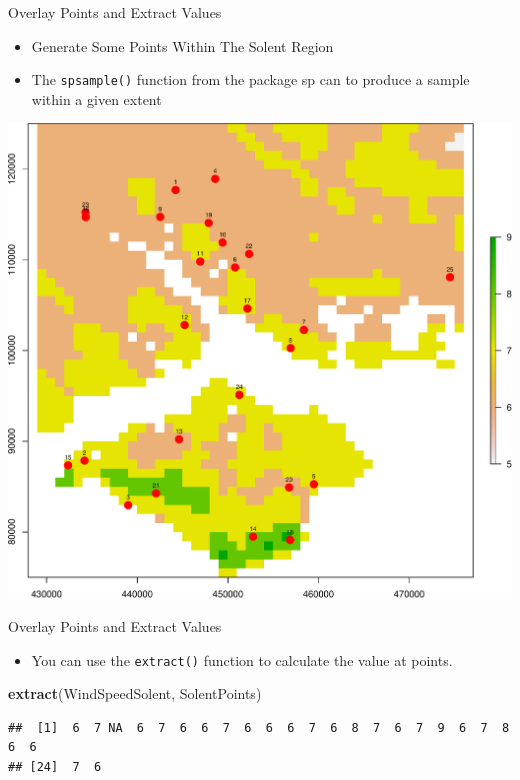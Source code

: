 \documentclass[10pt,ignorenonframetext,]{beamer}
\newenvironment{Shaded}{\begin{snugshade}}{\end{snugshade}}
\newcommand{\KeywordTok}[1]{\textcolor[rgb]{0.13,0.29,0.53}{\textbf{{#1}}}}
\newcommand{\DataTypeTok}[1]{\textcolor[rgb]{0.13,0.29,0.53}{{#1}}}
\newcommand{\DecValTok}[1]{\textcolor[rgb]{0.00,0.00,0.81}{{#1}}}
\newcommand{\StringTok}[1]{\textcolor[rgb]{0.31,0.60,0.02}{{#1}}}
\newcommand{\NormalTok}[1]{{#1}}
\providecommand{\tightlist}{%
  \setlength{\itemsep}{0pt}\setlength{\parskip}{0pt}}
\begin{document}
\begin{frame}[fragile]{Overlay Points and Extract Values}

\begin{itemize}
\tightlist
\item
  Generate Some Points Within The Solent Region
\item
  The \texttt{spsample()} function from the package \alert{sp} can to
  produce a sample within a given extent
\end{itemize}

\begin{Shaded}
\end{Shaded}

\begin{center}\includegraphics[width=0.5\linewidth]{SpatialDataLecture_files/figure-beamer/extract_vals_at_pts01-1} \end{center}

\end{frame}

\begin{frame}[fragile]{Overlay Points and Extract Values}

\begin{itemize}
\tightlist
\item
  You can use the \texttt{extract()} function to calculate the value at
  points.
\end{itemize}

\begin{Shaded}
\begin{Highlighting}[]
\KeywordTok{extract}\NormalTok{(WindSpeedSolent, SolentPoints)}
\end{Highlighting}
\end{Shaded}

\begin{verbatim}
##  [1]  6  7 NA  6  7  6  6  7  6  6  6  7  6  8  7  6  7  9  6  7  8  6  6
## [24]  7  6
\end{verbatim}

\end{frame}
\end{document}

